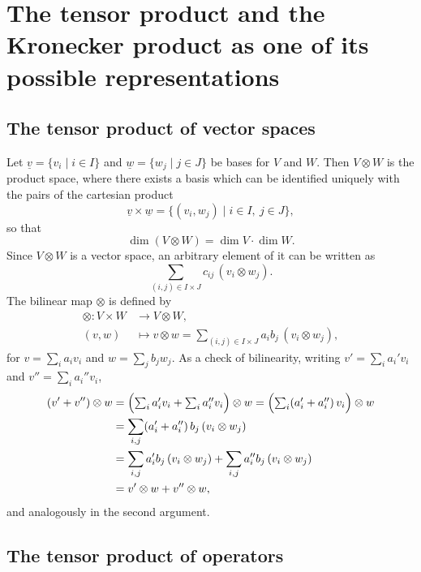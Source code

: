\documentclass[../../main.tex]{subfiles}
\begin{document}
\section{The tensor product and the Kronecker product as one of its possible representations}
\label{sec:tensor-product-kronecker}

\subsection{The tensor product of vector spaces}

Let $\underline v=\{v_i\mid i\in I\}$ and $\underline w=\{w_j\mid j\in J\}$ be bases for $V$
and $W$. Then $V\otimes W$ is the product space, where there exists a basis which can be
identified uniquely with the pairs of the cartesian product
\begin{equation}
\underline v\times\underline w=\bigl\{(v_i,w_j)\mid i\in I,\ j\in J\bigr\},
\end{equation}
so that
\begin{equation}
\dim(V\otimes W)=\dim V\cdot\dim W .
\end{equation}
Since $V\otimes W$ is a vector space, an arbitrary element of it can be written as
\begin{equation}
\sum_{(i,j)\in I\times J}c_{ij}\,(v_i\otimes w_j).
\end{equation}
The bilinear map $\otimes$ is defined by
\begin{align}
\otimes\colon V\times W&\longrightarrow V\otimes W,\\
(v,w)&\longmapsto v\otimes w=\sum_{(i,j)\in I\times J}a_i b_j\,(v_i\otimes w_j),
\end{align}
for $v=\sum_i a_i v_i$ and $w=\sum_j b_j w_j$. As a check of bilinearity, writing
$v'=\sum_i a_i' v_i$ and $v''=\sum_i a_i'' v_i$,
\begin{align}
(v'+v'')\otimes w
&=\Bigl(\textstyle\sum_i a_i' v_i+\sum_i a_i'' v_i\Bigr)\otimes w
=\Bigl(\textstyle\sum_i (a_i'+a_i'')\,v_i\Bigr)\otimes w\notag\\
&=\sum_{i,j}(a_i'+a_i'')\,b_j\,(v_i\otimes w_j)\notag\\
&=\sum_{i,j}a_i' b_j\,(v_i\otimes w_j)+\sum_{i,j}a_i'' b_j\,(v_i\otimes w_j)\notag\\
&=v'\otimes w+v''\otimes w,
\end{align}
and analogously in the second argument.

\subsection{The tensor product of operators}
\end{document}
